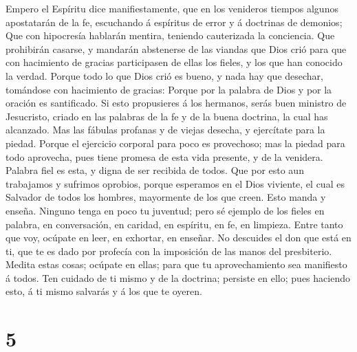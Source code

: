  Empero el Espíritu dice manifiestamente, que en los
venideros tiempos algunos apostatarán de la fe, escuchando á espíritus
de error y á doctrinas de demonios;  Que con hipocresía
hablarán mentira, teniendo cauterizada la conciencia.  Que
prohibirán casarse, y mandarán abstenerse de las viandas que Dios crió
para que con hacimiento de gracias participasen de ellas los fieles, y
los que han conocido la verdad.  Porque todo lo que Dios
crió es bueno, y nada hay que desechar, tomándose con hacimiento de
gracias:  Porque por la palabra de Dios y por la oración es
santificado.  Si esto propusieres á los hermanos, serás buen
ministro de Jesucristo, criado en las palabras de la fe y de la buena
doctrina, la cual has alcanzado.  Mas las fábulas profanas y
de viejas desecha, y ejercítate para la piedad.  Porque el
ejercicio corporal para poco es provechoso; mas la piedad para todo
aprovecha, pues tiene promesa de esta vida presente, y de la venidera.
 Palabra fiel es esta, y digna de ser recibida de todos.
 Que por esto aun trabajamos y sufrimos oprobios, porque
esperamos en el Dios viviente, el cual es Salvador de todos los hombres,
mayormente de los que creen.  Esto manda y enseña.
 Ninguno tenga en poco tu juventud; pero sé ejemplo de los
fieles en palabra, en conversación, en caridad, en espíritu, en fe, en
limpieza.  Entre tanto que voy, ocúpate en leer, en
exhortar, en enseñar.  No descuides el don que está en ti,
que te es dado por profecía con la imposición de las manos del
presbiterio.  Medita estas cosas; ocúpate en ellas; para
que tu aprovechamiento sea manifiesto á todos.  Ten cuidado
de ti mismo y de la doctrina; persiste en ello; pues haciendo esto, á ti
mismo salvarás y á los que te oyeren.

\hypertarget{section-4}{%
\section{5}\label{section-4}}

